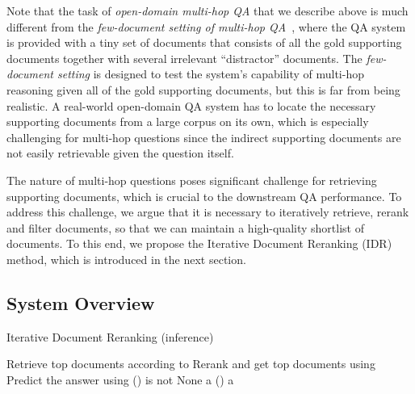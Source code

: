 \documentclass[sigconf]{acmart}
\begin{document}
Note that the task of \textit{open-domain multi-hop QA} that we describe above is much different from the \textit{few-document setting of multi-hop QA}~\cite{qi-etal-2019-answering}, where the QA system is provided with a tiny set of documents that consists of all the gold supporting documents together with several irrelevant ``distractor'' documents. The \textit{few-document setting} is designed to test the system's capability of multi-hop reasoning given all of the gold supporting documents, but this is far from being realistic. A real-world open-domain QA system has to locate the necessary supporting documents from a large corpus on its own, which is especially challenging for multi-hop questions since the indirect supporting documents are not easily retrievable given the question itself.






The nature of multi-hop questions poses significant challenge for retrieving supporting documents, which is crucial to the downstream QA performance. To address this challenge, we argue that it is necessary to iteratively retrieve, rerank and filter documents, so that we can maintain a high-quality shortlist of documents. To this end, we propose the Iterative Document Reranking (IDR) method, which is introduced in the next section.





















\subsection{System Overview}





\begin{algorithm}[t]
\caption{Iterative Document Reranking (inference)}
\label{alg:algorithm}
\DontPrintSemicolon
\SetNoFillComment
{}
 \;
 \;
\While{}
{
     \;
     Retrieve top  documents according to  \;
     \;
     Rerank and get top  documents using  \;
     Predict the answer using  \;
    \If()
    { is not None}
    {
        \Return a \;
    }
    \Else()
    {
         \;
    }
}
\Return a
\end{algorithm}
\end{document}
